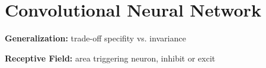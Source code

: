 \section{Convolutional Neural Network}
\textbf{Generalization:} trade-off specifity vs. invariance\\

\textbf{Receptive Field:} area triggering neuron, inhibit or excit\\

